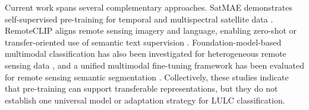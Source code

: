 \documentclass[]{interact}
\theoremstyle{plain}%
\theoremstyle{definition}
\theoremstyle{remark}
\DeclareRobustCommand{\DIFadd}[1]{{\protect\color{DIFaddcolor}\uwave{#1}}}
\def\DIFadd#1{#1}%
\begin{document}
\DIFadd{Current} \DIFadd{work} \DIFadd{spans} \DIFadd{several} \DIFadd{complementary} \DIFadd{approaches}\DIFadd{.} \DIFadd{SatMAE} \DIFadd{demonstrates} \DIFadd{self-supervised} \DIFadd{pre-training} \DIFadd{for} \DIFadd{temporal} \DIFadd{and} \DIFadd{multispectral} \DIFadd{satellite} \DIFadd{data} {\color{blue}\citep{cong2022satmae}}\DIFadd{.} \DIFadd{RemoteCLIP} \DIFadd{aligns} \DIFadd{remote} \DIFadd{sensing} \DIFadd{imagery} \DIFadd{and} \DIFadd{language}\DIFadd{,} \DIFadd{enabling} \DIFadd{zero-shot} \DIFadd{or} \DIFadd{transfer-oriented} \DIFadd{use} \DIFadd{of} \DIFadd{semantic} \DIFadd{text} \DIFadd{supervision} {\color{blue}\citep{liu2024remoteclip}}\DIFadd{.} \DIFadd{Foundation-model-based} \DIFadd{multimodal} \DIFadd{classification} \DIFadd{has} \DIFadd{also} \DIFadd{been} \DIFadd{investigated} \DIFadd{for} \DIFadd{heterogeneous} \DIFadd{remote} \DIFadd{sensing} \DIFadd{data} {\color{blue}\citep{he2024foundation}}\DIFadd{,} \DIFadd{and} \DIFadd{a} \DIFadd{unified} \DIFadd{multimodal} \DIFadd{fine-tuning} \DIFadd{framework} \DIFadd{has} \DIFadd{been} \DIFadd{evaluated} \DIFadd{for} \DIFadd{remote} \DIFadd{sensing} \DIFadd{semantic} \DIFadd{segmentation} {\color{blue}\citep{ma2025multimodal}}\DIFadd{.} \DIFadd{Collectively}\DIFadd{,} \DIFadd{these} \DIFadd{studies} \DIFadd{indicate} \DIFadd{that} \DIFadd{pre-training} \DIFadd{can} \DIFadd{support} \DIFadd{transferable} \DIFadd{representations}\DIFadd{,} \DIFadd{but} \DIFadd{they} \DIFadd{do} \DIFadd{not} \DIFadd{establish} \DIFadd{one} \DIFadd{universal} \DIFadd{model} \DIFadd{or} \DIFadd{adaptation} \DIFadd{strategy} \DIFadd{for} \DIFadd{LULC} \DIFadd{classification}\DIFadd{.}
\end{document}
